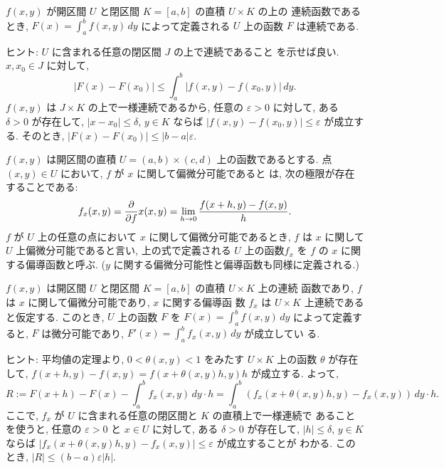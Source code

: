 \documentclass[12pt,twoside]{jarticle}
\begin{document}
\begin{question}[積分表示された函数の連続性]
  $f(x,y)$ が開区間 $U$ と閉区間 $K=[a,b]$ の直積 $U \times K$ の上の
  連続函数であるとき, $F(x)=\int_a^b f(x,y)\,dy$ によって定義される %
  $U$ 上の函数 $F$ は連続である.
\end{question}

\noindent ヒント: $U$ に含まれる任意の閉区間 $J$ の上で連続であること
を示せば良い. $x,x_0\in J$ に対して,
\[
  |F(x) - F(x_0)|
  \le \int_a^b |f(x,y) - f(x_0,y)| \,dy.
\]
$f(x,y)$ は $J\times K$ の上で一様連続であるから, %
任意の $\varepsilon > 0$ に対して, ある $\delta > 0$ が存在して, %
$|x - x_0| \le \delta$, $y\in K$ ならば %
$|f(x,y) - f(x_0,y)| \le \varepsilon$ が成立する. そのとき, %
\break
$|F(x) - F(x_0)| \le |b-a| \varepsilon$.  

\begin{Definition}[偏導函数]
  $f(x,y)$ は開区間の直積 $U=(a,b)\times(c,d)$ 上の函数であるとする. 
  点 $(x,y)\in U$ において, $f$ が $x$ に関して偏微分可能であると
  は, 次の極限が存在することである:
  \[
    f_x(x,y) = \frac{\partial}{\partial f}{x}(x,y)
    = \lim_{h\to0} \frac{f(x+h,y) - f(x,y)}{h}.
  \] %
  $f$ が $U$ 上の任意の点において $x$ に関して偏微分可能であるとき, %
  $f$ は $x$ に関して $U$ 上偏微分可能であると言い, 上の式で定義される%
  $U$ 上の函数$f_x$ を $f$ の $x$ に関する偏導函数と呼ぶ.
  ($y$ に関する偏微分可能性と偏導函数も同様に定義される.)
\end{Definition}

\begin{question}[積分と微分の交換]
  $f(x,y)$ は開区間 $U$ と閉区間 $K=[a,b]$ の直積 $U\times K$ 上の連続
  函数であり, $f$ は $x$ に関して偏微分可能であり, $x$ に関する偏導函
  数 $f_x$ は $U\times K$ 上連続であると仮定する. このとき, 
  $U$ 上の函数 $F$ を $F(x) = \int_a^b f(x,y)\,dy$ によって定義すると,
  $F$ は微分可能であり, $F'(x) = \int_a^b f_x(x,y)\,dy$ が成立してい
  る.
\end{question}

\noindent ヒント: 平均値の定理より, $0 < \theta(x,y) < 1$ をみたす %
$U\times K$ 上の函数 $\theta$ が存在して, %
\break
$f(x+h,y) - f(x,y) = f(x+\theta(x,y)h,y)h$ が成立する. よって,
\[
  R := F(x+h) - F(x) - \int_a^b f_x(x,y)\,dy \cdot h
  = \int_a^b ( f_x(x+\theta(x,y)h,y) - f_x(x,y))\,dy \cdot h.
\]
ここで, $f_x$ が $U$ に含まれる任意の閉区間と $K$ の直積上で一様連続で
あることを使うと, 任意の $\varepsilon > 0$ と $x\in U$ に対して, %
ある $\delta > 0$ が存在して, $|h|\le\delta$, $y\in K$ ならば %
\break
$|f_x(x+\theta(x,y)h,y) - f_x(x,y)| \le \varepsilon$ が成立することが
わかる. このとき, $|R| \le (b-a) \varepsilon |h|$.
\end{document}
